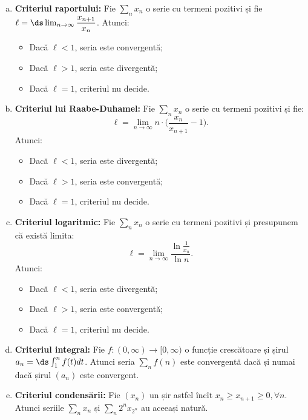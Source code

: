 \begin{enumerate}[(a)]
\begin{itemize}
  \item Dacă $ \ell > 1 $, seria este divergentă;
  \item Dacă $ \ell = 1 $, criteriul nu decide.
  \end{itemize}
\item \textbf{Criteriul raportului:} Fie $ \sum_n x_n $ o serie cu termeni
  pozitivi și fie $ \ell = \ds\lim_{n \to \infty} \dfrac{x_{n+1}}{x_n} $.
  Atunci:
  \begin{itemize}
  \item Dacă $ \ell < 1 $, seria este convergentă;
  \item Dacă $ \ell > 1 $, seria este divergentă;
  \item Dacă $ \ell = 1 $, criteriul nu decide.
  \end{itemize}
\item \textbf{Criteriul lui Raabe-Duhamel:} Fie $ \sum_n x_n $ o serie
  cu termeni pozitivi și fie:
  \[
    \ell = \lim_{n \to \infty} n \cdot \Big( \frac{x_n}{x_{n+1}} - 1 \Big).
  \]
  Atunci:
  \begin{itemize}
  \item Dacă $ \ell < 1 $, seria este divergentă;
  \item Dacă $ \ell > 1 $, seria este convergentă;
  \item Dacă $ \ell = 1 $, criteriul nu decide.
  \end{itemize}
\item \textbf{Criteriul logaritmic:} Fie $ \sum_n x_n $ o serie cu termeni
  pozitivi și presupunem că există limita:
  \[
    \ell = \lim_{n \to \infty} \frac{\ln \frac{1}{x_n}}{\ln n}.
  \]
  Atunci:
  \begin{itemize}
  \item Dacă $ \ell < 1 $, seria este divergentă;
  \item Dacă $ \ell > 1 $, seria este convergentă;
  \item Dacă $ \ell = 1 $, criteriul nu decide.
  \end{itemize}
\item \textbf{Criteriul integral:} Fie $ f: (0, \infty) \to [0, \infty) $ o
  funcție crescătoare și șirul $ a_n = \ds\int_1^n f(t) dt $. Atunci seria
  $ \sum_n f(n) $ este convergentă dacă și numai dacă șirul $ (a_n) $ este
  convergent.
\item \textbf{Criteriul condensării:} Fie $ (x_n) $ un șir astfel încît
  $ x_n \geq x_{n+1} \geq 0, \forall n $.
  Atunci seriile $ \sum_n x_n $ și $ \sum_n 2^n x_{2^n} $ au aceeași natură.
\end{enumerate}

